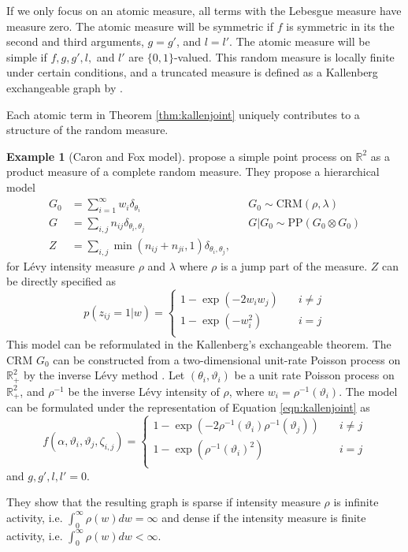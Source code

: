 \documentclass{article}
\theoremstyle{definition}
\newtheorem{example}{Example}[definition]
\begin{document}
If we only focus on an atomic measure, all terms with the Lebesgue measure have measure zero. The atomic measure will be symmetric if $f$ is symmetric in its the second and third arguments, $g = g'$, and $l=l'$. The atomic measure will be simple if $f, g, g', l,$ and $l'$ are $\{0,1\}$-valued. This random measure is locally finite under certain conditions, and a truncated measure is defined as a Kallenberg exchangeable graph by \cite{Veitch2015}. 

Each atomic term in Theorem \ref{thm:kallenjoint} uniquely contributes to a structure of the random measure.

\begin{example}[\label{caron2015}Caron and Fox model]
\cite{Caron2015} propose a simple point process on $\mathbb{R}^2$ as a product measure of a complete random measure. They propose a hierarchical model
\begin{align}
G_0 &= \sum_{i=1}^{\infty} w_i \delta_{\theta_i} & &G_0 \sim \text{CRM}(\rho, \lambda)\\
G &= \sum_{i,j} n_{ij} \delta_{\theta_i, \theta_j} & &G|G_0 \sim \text{PP}(G_0 \otimes G_0)\\
Z &=\sum_{i,j} \min(n_{ij} + n_{ji}, 1)\delta_{\theta_i, \theta_j}, &&
\end{align}
for L\'{e}vy intensity measure $\rho$ and $\lambda$ where $\rho$ is a jump part of the measure.
$Z$ can be directly specified as
\[ p(z_{ij}=1|w) = 
  \begin{cases}
    1 - \exp(-2w_iw_j)       & \quad i \neq j\\
    1 - \exp(-w_i^2) & \quad i = j\\
  \end{cases}
\]
This model can be reformulated in the Kallenberg's exchangeable theorem. The CRM $G_0$ can be constructed from a two-dimensional unit-rate Poisson process on $\mathbb{R}_+^2$ by the inverse L\'{e}vy method \cite{ferguson1972representation}. Let $(\theta_i, \vartheta_i)$ be a unit rate Poisson process on $\mathbb{R}_+^2$, and $\rho^{-1}$ be the inverse L\'{e}vy intensity of $\rho$, where $w_i = \rho^{-1}(\vartheta_i)$. The model can be formulated under the representation of Equation \ref{eqn:kallenjoint} as 
\[ f(\alpha, \vartheta_i, \vartheta_j, \zeta_{i,j}) =
	\begin{cases}
	1- \exp(-2\rho^{-1}(\vartheta_i)\rho^{-1}(\vartheta_j)) & \quad i \neq j\\
    1 - \exp( \rho^{-1}(\vartheta_i)^2) & \quad i = j\\
	\end{cases}
\]
and $g,g',l,l'=0$. 

They show that the resulting graph is sparse if intensity measure $\rho$ is infinite activity, i.e. $\int_{0}^{\infty} \rho(w)dw = \infty$ and dense if the intensity measure is finite activity, i.e. $\int_{0}^{\infty} \rho(w)dw < \infty$.
\end{example}
\end{document}
